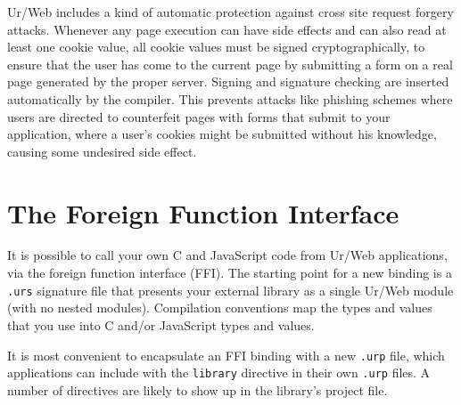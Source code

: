 \documentclass{article}
\begin{document}
Ur/Web includes a kind of automatic protection against cross site request forgery attacks.  Whenever any page execution can have side effects and can also read at least one cookie value, all cookie values must be signed cryptographically, to ensure that the user has come to the current page by submitting a form on a real page generated by the proper server.  Signing and signature checking are inserted automatically by the compiler.  This prevents attacks like phishing schemes where users are directed to counterfeit pages with forms that submit to your application, where a user's cookies might be submitted without his knowledge, causing some undesired side effect.


\section{The Foreign Function Interface}

It is possible to call your own C and JavaScript code from Ur/Web applications, via the foreign function interface (FFI).  The starting point for a new binding is a \texttt{.urs} signature file that presents your external library as a single Ur/Web module (with no nested modules).  Compilation conventions map the types and values that you use into C and/or JavaScript types and values.

It is most convenient to encapsulate an FFI binding with a new \texttt{.urp} file, which applications can include with the \texttt{library} directive in their own \texttt{.urp} files.  A number of directives are likely to show up in the library's project file.
\end{document}
